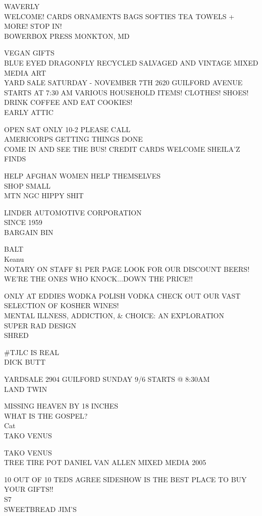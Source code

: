 \documentclass[10pt,letterpaper]{article}
\begin{document}
WAVERLY\\
WELCOME!  CARDS ORNAMENTS BAGS SOFTIES TEA TOWELS + MORE! STOP IN!\\
BOWERBOX PRESS MONKTON, MD

VEGAN GIFTS\\
BLUE EYED DRAGONFLY RECYCLED SALVAGED AND VINTAGE MIXED MEDIA ART\\
YARD SALE SATURDAY {-} NOVEMBER 7TH 2620 GUILFORD AVENUE STARTS AT 7:30 AM VARIOUS HOUSEHOLD ITEMS!  CLOTHES!  SHOES!  DRINK COFFEE AND EAT COOKIES!\\
EARLY ATTIC

OPEN SAT ONLY 10{-}2 PLEASE CALL\\
AMERICORPS GETTING THINGS DONE\\
COME IN AND SEE THE BUS!  CREDIT CARDS WELCOME SHEILA'Z FINDS

HELP AFGHAN WOMEN HELP THEMSELVES\\
SHOP SMALL\\
MTN NGC HIPPY SHIT

LINDER AUTOMOTIVE CORPORATION\\
SINCE 1959\\
BARGAIN BIN

BALT\\
Keanu\\
NOTARY ON STAFF \$1 PER PAGE LOOK FOR OUR DISCOUNT BEERS!  WE'RE THE ONES WHO KNOCK...DOWN THE PRICE!!

ONLY AT EDDIES WODKA POLISH VODKA CHECK OUT OUR VAST SELECTION OF KOSHER WINES!\\
MENTAL ILLNESS, ADDICTION, \& CHOICE: AN EXPLORATION\\
SUPER RAD DESIGN\\
SHRED

\#TJLC IS REAL\\
DICK BUTT

YARDSALE 2904 GUILFORD SUNDAY 9/6 STARTS @ 8:30AM\\
LAND TWIN

MISSING HEAVEN BY 18 INCHES\\
WHAT IS THE GOSPEL?\\
Cat\\
TAKO VENUS

TAKO VENUS\\
TREE TIRE POT DANIEL VAN ALLEN MIXED MEDIA 2005

10 OUT OF 10 TEDS AGREE SIDESHOW IS THE BEST PLACE TO BUY YOUR GIFTS!!\\
S7\\
SWEETBREAD JIM'S
\end{document}
